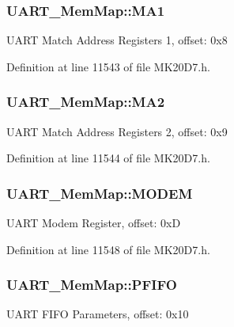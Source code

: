 \subsubsection[{\texorpdfstring{M\+A1}{MA1}}]{ U\+A\+R\+T\+\_\+\+Mem\+Map\+::\+M\+A1}\hypertarget{struct_u_a_r_t___mem_map_a0150c1ad073843276caf61c950794c17}{}\label{struct_u_a_r_t___mem_map_a0150c1ad073843276caf61c950794c17}
U\+A\+RT Match Address Registers 1, offset\+: 0x8 

Definition at line 11543 of file M\+K20\+D7.\+h.

\subsubsection[{\texorpdfstring{M\+A2}{MA2}}]{ U\+A\+R\+T\+\_\+\+Mem\+Map\+::\+M\+A2}\hypertarget{struct_u_a_r_t___mem_map_ab6612fcc8e4f43ebae15982f6da2b567}{}\label{struct_u_a_r_t___mem_map_ab6612fcc8e4f43ebae15982f6da2b567}
U\+A\+RT Match Address Registers 2, offset\+: 0x9 

Definition at line 11544 of file M\+K20\+D7.\+h.

\subsubsection[{\texorpdfstring{M\+O\+D\+EM}{MODEM}}]{ U\+A\+R\+T\+\_\+\+Mem\+Map\+::\+M\+O\+D\+EM}\hypertarget{struct_u_a_r_t___mem_map_a2eb889dcd179b02f46cf67c98792e130}{}\label{struct_u_a_r_t___mem_map_a2eb889dcd179b02f46cf67c98792e130}
U\+A\+RT Modem Register, offset\+: 0xD 

Definition at line 11548 of file M\+K20\+D7.\+h.

\subsubsection[{\texorpdfstring{P\+F\+I\+FO}{PFIFO}}]{ U\+A\+R\+T\+\_\+\+Mem\+Map\+::\+P\+F\+I\+FO}\hypertarget{struct_u_a_r_t___mem_map_a6ad16328066eeb949b4ee3d4a67776be}{}\label{struct_u_a_r_t___mem_map_a6ad16328066eeb949b4ee3d4a67776be}
U\+A\+RT F\+I\+FO Parameters, offset\+: 0x10 

